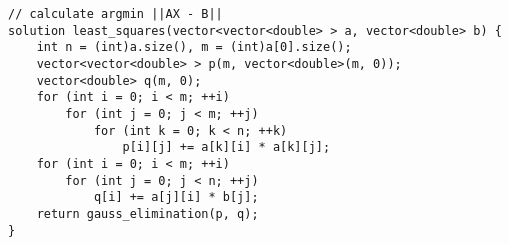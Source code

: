 \begin{lstlisting}
// calculate argmin ||AX - B||
solution least_squares(vector<vector<double> > a, vector<double> b) {
	int n = (int)a.size(), m = (int)a[0].size();
	vector<vector<double> > p(m, vector<double>(m, 0));
	vector<double> q(m, 0);
	for (int i = 0; i < m; ++i)
		for (int j = 0; j < m; ++j)
			for (int k = 0; k < n; ++k)
				p[i][j] += a[k][i] * a[k][j];
	for (int i = 0; i < m; ++i)
		for (int j = 0; j < n; ++j)
			q[i] += a[j][i] * b[j];
	return gauss_elimination(p, q);
}
\end{lstlisting}
